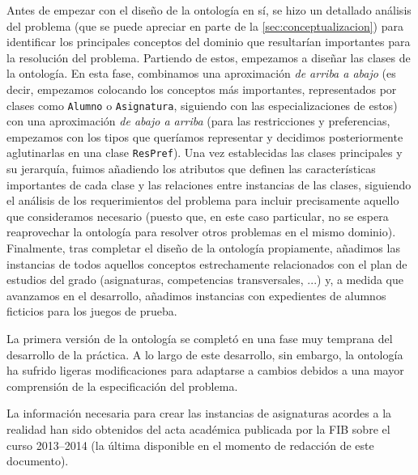 Antes de empezar con el diseño de la ontología en sí, se hizo un detallado 
análisis del problema (que se puede apreciar en parte de la 
\autoref{sec:conceptualizacion}) para identificar los principales conceptos 
del dominio que resultarían importantes para la resolución del problema. 
Partiendo de estos, empezamos a diseñar las clases de la ontología. En esta 
fase, combinamos una aproximación \textit{de arriba a abajo} (es decir, 
empezamos colocando los conceptos más importantes, representados por clases 
como \texttt{Alumno} o \texttt{Asignatura}, siguiendo con las 
especializaciones de estos) con una aproximación \textit{de abajo a arriba} 
(para las restricciones y preferencias, empezamos con los tipos que queríamos 
representar y decidimos posteriormente aglutinarlas en una clase 
\texttt{ResPref}). Una vez establecidas las clases principales y su jerarquía, 
fuimos añadiendo los atributos que definen las características importantes 
de cada clase y las relaciones entre instancias de las clases, siguiendo el 
análisis de los requerimientos del problema para incluir precisamente aquello 
que consideramos necesario (puesto que, en este caso particular, no se espera 
reaprovechar la ontología para resolver otros problemas en el mismo dominio). 
Finalmente, tras completar el diseño de la ontología propiamente, añadimos las 
instancias de todos aquellos conceptos estrechamente relacionados con el plan 
de estudios del grado (asignaturas, competencias transversales, ...) y, a 
medida que avanzamos en el desarrollo, añadimos instancias con expedientes de 
alumnos ficticios para los juegos de prueba.

La primera versión de la ontología se completó en una fase muy temprana del 
desarrollo de la práctica. A lo largo de este desarrollo, sin embargo, la 
ontología ha sufrido ligeras modificaciones para adaptarse a cambios debidos 
a una mayor comprensión de la especificación del problema. 

La información necesaria para crear las instancias de asignaturas acordes a la 
realidad han sido obtenidos del acta académica publicada por la FIB sobre el 
curso 2013--2014 (la última disponible en el momento de redacción de este 
documento).




